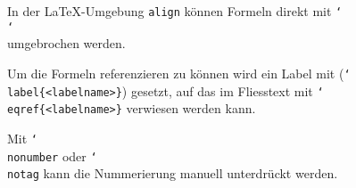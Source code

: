 
In der \LaTeX-Umgebung \texttt{align} können Formeln direkt mit \texttt{\char`\\}\texttt{\char`\\} umgebrochen werden.

Um die Formeln referenzieren zu können wird ein Label mit (\texttt{\char`\\label\{<labelname>\}}) gesetzt, auf das im Fliesstext mit \texttt{\char`\\eqref\{<labelname>\}} verwiesen werden kann.

Mit \texttt{\char`\\nonumber} oder \texttt{\char`\\notag} kann die Nummerierung manuell unterdrückt werden.
